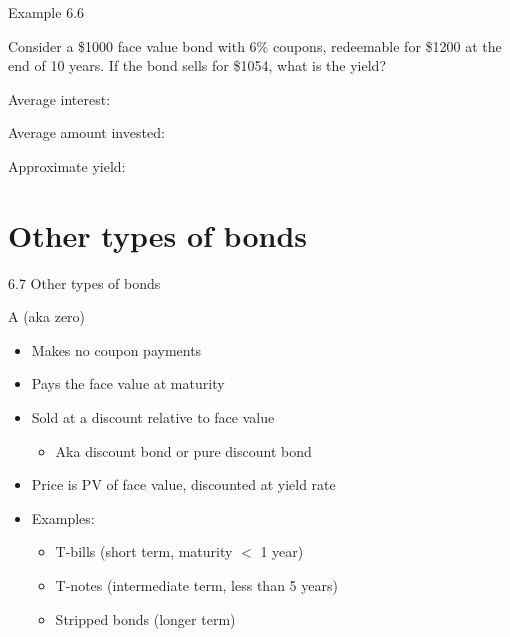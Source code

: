 \documentclass{beamer}
\begin{document}
\begin{frame}{Example 6.6}

Consider a \$1000 face value bond with 6\% coupons, redeemable for \$1200 at the end of 10 years. If the bond sells for \$1054, what is the yield?

\begin{center}
\end{center}

\bigskip
Average interest:

\vfill
Average amount invested:

\vfill
Approximate yield:

\vfill
\end{frame}

\section{Other types of bonds}

\begin{frame}{6.7 Other types of bonds}

A  (aka zero)
\begin{itemize}
\item Makes no coupon payments
\item Pays the face value at maturity
\item Sold at a discount relative to face value
  \begin{itemize}
  \item Aka discount bond or pure discount bond
  \end{itemize}
\item Price is PV of face value, discounted at yield rate
\item Examples:
  \begin{itemize}
  \item T-bills (short term, maturity $<$ 1 year)
  \item T-notes (intermediate term, less than 5 years)
  \item Stripped bonds (longer term)
  \end{itemize}
\end{itemize}

\end{frame}
\end{document}
